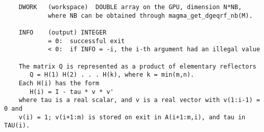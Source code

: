 \documentclass[10pt]{book}
\begin{document}
\begin{verbatim}
    DWORK   (workspace)  DOUBLE array on the GPU, dimension N*NB,
            where NB can be obtained through magma_get_dgeqrf_nb(M).

    INFO    (output) INTEGER   
            = 0:  successful exit   
            < 0:  if INFO = -i, the i-th argument had an illegal value   
 
    The matrix Q is represented as a product of elementary reflectors   
       Q = H(1) H(2) . . . H(k), where k = min(m,n).   
    Each H(i) has the form   
       H(i) = I - tau * v * v'   
    where tau is a real scalar, and v is a real vector with v(1:i-1) = 0 and 
    v(i) = 1; v(i+1:m) is stored on exit in A(i+1:m,i), and tau in TAU(i).   
\end{verbatim}

\newpage
\end{document}
